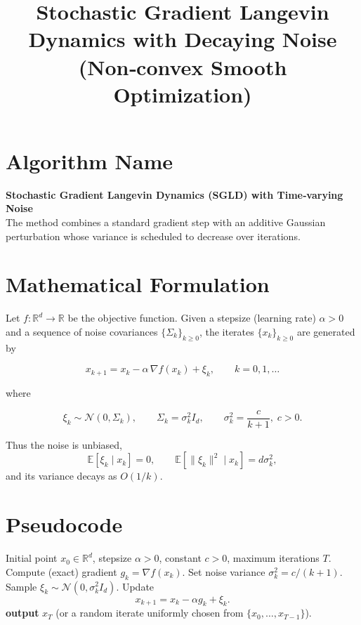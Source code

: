 \documentclass{article}
\newcommand{\E}{\mathbb{E}}
\newcommand{\R}{\mathbb{R}}
\begin{document}
\title{Stochastic Gradient Langevin Dynamics with Decaying Noise\\
(Non‑convex Smooth Optimization)}
\author{}
\date{}
\maketitle

\section*{Algorithm Name}
\textbf{Stochastic Gradient Langevin Dynamics (SGLD) with Time‑varying Noise}\\
The method combines a standard gradient step with an additive Gaussian
perturbation whose variance is scheduled to decrease over iterations.

\section*{Mathematical Formulation}
Let $f:\R^{d}\rightarrow\R$ be the objective function.
Given a stepsize (learning rate) $\alpha>0$ and a sequence of noise
covariances $\{\Sigma_{k}\}_{k\ge 0}$,
the iterates $\{x_{k}\}_{k\ge 0}$ are generated by  

\[
\boxed{
x_{k+1}=x_{k}-\alpha\,\nabla f(x_{k})+\xi_{k}},\qquad k=0,1,\dots
\tag{1}
\]

where  

\[
\xi_{k}\sim\mathcal N(0,\Sigma_{k}),\qquad 
\Sigma_{k}= \sigma_{k}^{2} I_{d},\qquad 
\sigma_{k}^{2}= \frac{c}{k+1},\;c>0.
\tag{2}
\]

Thus the noise is unbiased,
\[
\E[\xi_{k}\mid x_{k}]=0,\qquad \E[\|\xi_{k}\|^{2}\mid x_{k}]=d\sigma_{k}^{2},
\tag{3}
\]
and its variance decays as $O(1/k)$.

\section*{Pseudocode}
\begin{algorithm}[H]
\caption{SGLD with Decaying Noise}
\begin{algorithmic}[1]
\Require Initial point $x_{0}\in\R^{d}$, stepsize $\alpha>0$, constant $c>0$, maximum iterations $T$.
    \State Compute (exact) gradient $g_{k}= \nabla f(x_{k})$.
    \State Set noise variance $\sigma_{k}^{2}=c/(k+1)$.
    \State Sample $\xi_{k}\sim\mathcal N(0,\sigma_{k}^{2} I_{d})$.
    \State Update 
    \[
    x_{k+1}=x_{k}-\alpha g_{k}+ \xi_{k}.
    \]
\EndFor
\State \textbf{output} $x_{T}$ (or a random iterate uniformly chosen from $\{x_{0},\dots,x_{T-1}\}$).
\end{algorithmic}
\end{algorithm}
\end{document}
